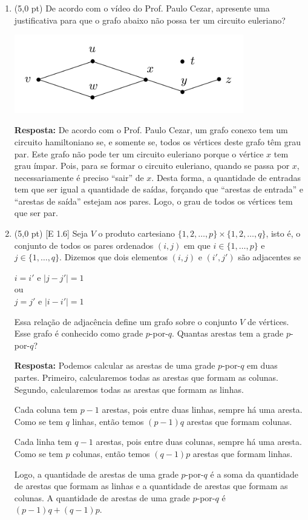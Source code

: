 \documentclass[12pt,a4paper,oneside]{article}
\begin{document}
\begin{enumerate}

	\item (5,0 pt) De acordo com o vídeo do Prof. Paulo Cezar, apresente uma justificativa para que o grafo abaixo não possa ter um circuito euleriano?
	\begin{center}
	    \includegraphics[width=10cm]{images/grafo.png}
	\end{center}
	
	{\color{blue} {\bf Resposta:} De acordo com o Prof. Paulo Cezar, um grafo conexo tem um circuito hamiltoniano se, e somente se, todos os vértices deste grafo têm grau par. Este grafo não pode ter um circuito euleriano porque o vértice $x$ tem grau ímpar. Pois, para se formar o circuito euleriano, quando se passa por $x$, necessariamente é preciso ``sair'' de $x$. Desta forma, a quantidade de entradas tem que ser igual a quantidade de saídas, forçando que ``arestas de entrada'' e ``arestas de saída'' estejam aos pares. Logo, o grau de todos os vértices tem que ser par. }
	
	\newpage
	
	\item (5,0 pt) [E 1.6] Seja $V$ o produto cartesiano $\{1,2, \ldots, p\} \times \{1,2, \ldots, q\}$, isto é, o conjunto de todos os pares ordenados $(i,j)$ em que $i \in \{1, \ldots, p\}$ e  $j \in \{1, \ldots, q\}$. Dizemos que dois elementos $(i,j)$ e $(i',j')$ são adjacentes se 
	\begin{center}
	    $i = i'$ e $|j - j'|=1$ \\
	    ou \\
	    $j = j'$ e $|i - i'|=1$
	\end{center}
	Essa relação de adjacência define um grafo sobre o conjunto $V$ de vértices. Esse grafo é conhecido como grade $p$-por-$q$. Quantas arestas tem a grade $p$-por-$q$?
	
	{\color{blue} {\bf Resposta:} Podemos calcular as arestas de uma grade $p$-por-$q$ em duas partes. Primeiro, calcularemos todas as arestas que formam as colunas. Segundo, calcularemos todas as arestas que formam as linhas. 
	
	Cada coluna tem $p-1$ arestas, pois entre duas linhas, sempre há uma aresta. Como se tem $q$ linhas, então temos $(p-1)q$ arestas que formam colunas.
	
	Cada linha tem $q-1$ arestas, pois entre duas colunas, sempre há uma aresta. Como se tem $p$ colunas, então temos $(q-1)p$ arestas que formam linhas.
	
	Logo, a quantidade de arestas de uma grade $p$-por-$q$ é a soma da quantidade de arestas que formam as linhas e a quantidade de arestas que formam as colunas. A quantidade de arestas de uma grade $p$-por-$q$  é $(p-1)q + (q-1)p$.}
	
	\end{enumerate}
\end{document}
